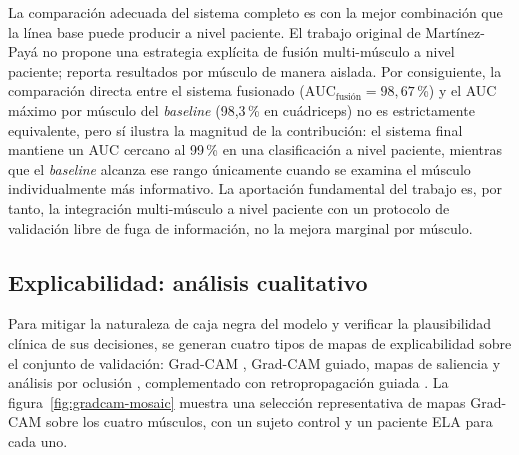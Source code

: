 \documentclass[12pt]{extarticle}
\numberwithin{equation}{section}
\begin{document}
\begin{refsection}
La comparación adecuada del sistema completo es con la mejor combinación que la línea base puede producir a nivel paciente. El trabajo original de Martínez-Payá no propone una estrategia explícita de fusión multi-músculo a nivel paciente; reporta resultados por músculo de manera aislada. Por consiguiente, la comparación directa entre el sistema fusionado ($\text{AUC}_{\text{fusión}} = 98{,}67$\,\%) y el AUC máximo por músculo del \textit{baseline} (98{,}3\,\% en cuádriceps) no es estrictamente equivalente, pero sí ilustra la magnitud de la contribución: el sistema final mantiene un AUC cercano al 99\,\% en una clasificación a nivel paciente, mientras que el \textit{baseline} alcanza ese rango únicamente cuando se examina el músculo individualmente más informativo. La aportación fundamental del trabajo es, por tanto, la integración multi-músculo a nivel paciente con un protocolo de validación libre de fuga de información, no la mejora marginal por músculo.

\subsection{Explicabilidad: análisis cualitativo}\label{subsec:resultados-explain}

Para mitigar la naturaleza de caja negra del modelo y verificar la plausibilidad clínica de sus decisiones, se generan cuatro tipos de mapas de explicabilidad sobre el conjunto de validación: Grad-CAM \cite{selvaraju2017gradcam}, Grad-CAM guiado, mapas de saliencia \cite{simonyan2014deep} y análisis por oclusión \cite{zeiler2014visualizing}, complementado con retropropagación guiada \cite{springenberg2015striving}. La figura~\ref{fig:gradcam-mosaic} muestra una selección representativa de mapas Grad-CAM sobre los cuatro músculos, con un sujeto control y un paciente ELA para cada uno.


\end{refsection}
\end{document}
